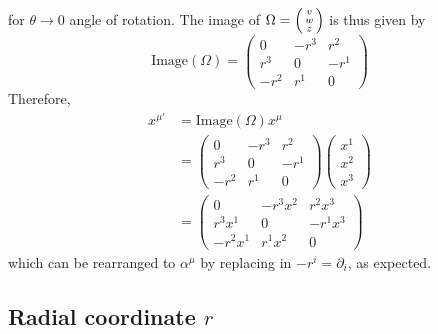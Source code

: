 \documentclass{article}
\begin{document}
			for $\theta \to 0$ angle of rotation. The image of $\Omega = \begin{psmallmatrix} v\\w\\z \end{psmallmatrix}$ is thus given by
			$$ \text{Image} (\Omega) = \begin{pmatrix}
				0	&	-r^3	&	r^2	\\
				r^3	&	0		&	-r^1 \\
				 -r^2	&	r^1	&	0
			\end{pmatrix}$$
 			Therefore,
 			\begin{align*}
 				x^{\mu'} &= \text{Image}(\Omega) x^\mu \\
 				&= \begin{pmatrix}
 						0	&	-r^3	&	r^2	\\
 						r^3	&	0		&	-r^1 \\
 						-r^2	&	r^1	&	0
 					\end{pmatrix}
 					\begin{pmatrix}
 						x^1 \\
 						x^2 \\
 						x^3
 					\end{pmatrix}\\
 				&= \begin{pmatrix}
 					0	&	-r^3 x^2 & r^2 x^3 \\
 					r^3 x^1 & 0 & -r^1 x^3 \\
 					-r^2 x^1 & r^1 x^2 & 0
 				\end{pmatrix}
 			\end{align*}
 			which can be rearranged to $\alpha^\mu$ by replacing in $-r^i = \partial_i$, as expected.
 			
 		\subsection{Radial coordinate $r$}
\end{document}
